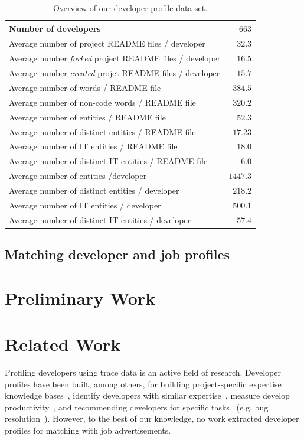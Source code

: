 \documentclass[conference]{IEEEtran}
\begin{document}
\begin{table}[htb]
\centering
\begin{tabular}{lr}
\toprule
Number of developers									& $663$\\
\midrule
Average number of project README files / developer	& $32.3$\\
Average number \emph{forked} project README files / developer	& $16.5$\\
Average number \emph{created} projet README files / developer & $15.7$\\
\midrule
Average number of words / README file		& $384.5$\\
Average number of non-code words / README file 	& $320.2$\\
\midrule
Average number of entities / README file 					& $52.3$\\
Average number of distinct entities / README file 					& $17.23$\\
\midrule
Average number of IT entities / README file				& $18.0$\\
Average number of distinct IT entities / README file				& $6.0$\\
\midrule
Average number of entities /developer						& $1447.3$\\
Average number of distinct entities / developer					& $218.2$\\
Average number of IT entities / developer			& $500.1$\\
Average number of distinct IT entities / developer				& $57.4$\\
\bottomrule
\end{tabular}
\caption{Overview of our developer profile data set.}
\label{tab:developers}
\end{table}


\subsection{Matching developer and job profiles}


\section{Preliminary Work}

\section{Related Work}

Profiling developers using trace data is an active field of research. Developer
profiles have been built, among others, for building project-specific expertise
knowledge bases~\cite{Mocku02}, identify developers with similar
expertise~\cite{Schuler08}, measure develop productivity~\cite{Gousi08},
and recommending developers for specific tasks~\cite{ying14} (e.g. bug
resolution~\cite{Anvik06}). However, to the best of our knowledge, no work
extracted developer profiles for matching with job advertisements.
\end{document}
